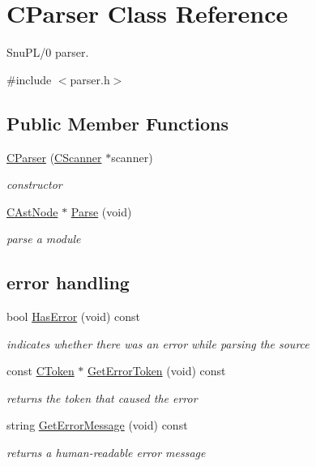\hypertarget{classCParser}{\section{C\-Parser Class Reference}
\label{classCParser}
}


Snu\-P\-L/0 parser.  




{\ttfamily \#include $<$parser.\-h$>$}

\subsection*{Public Member Functions}
\begin{DoxyCompactItemize}
\item 
\hyperlink{classCParser_a1ce2c31c3fab59fca2137e6547ca79f9}{C\-Parser} (\hyperlink{classCScanner}{C\-Scanner} $\ast$scanner)
\begin{DoxyCompactList}\small\item\em constructor \end{DoxyCompactList}\item 
\hyperlink{classCAstNode}{C\-Ast\-Node} $\ast$ \hyperlink{classCParser_a5d9607221a9578b20be8e4ac41640ac8}{Parse} (void)
\begin{DoxyCompactList}\small\item\em parse a module \end{DoxyCompactList}\end{DoxyCompactItemize}
\subsection*{error handling}
\begin{DoxyCompactItemize}
\item 
bool \hyperlink{classCParser_a4d97ee936fd96af9b1db0a08d80cfdfe}{Has\-Error} (void) const 
\begin{DoxyCompactList}\small\item\em indicates whether there was an error while parsing the source \end{DoxyCompactList}\item 
const \hyperlink{classCToken}{C\-Token} $\ast$ \hyperlink{classCParser_af6adbe55b1ead5a60695f803e49a858b}{Get\-Error\-Token} (void) const 
\begin{DoxyCompactList}\small\item\em returns the token that caused the error \end{DoxyCompactList}\item 
string \hyperlink{classCParser_a6b6b3e3141aa9cad9fd0945dbd545045}{Get\-Error\-Message} (void) const 
\begin{DoxyCompactList}\small\item\em returns a human-\/readable error message \end{DoxyCompactList}\end{DoxyCompactItemize}


